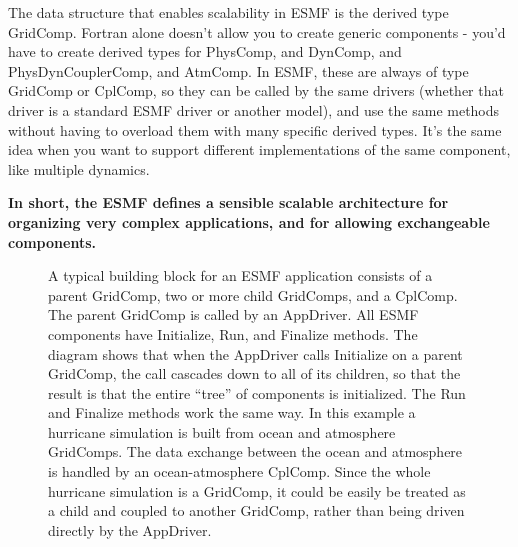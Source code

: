 The data structure that enables scalability in ESMF is the
derived type GridComp.  Fortran alone doesn't allow you to create
generic components - you'd have to create derived types for
PhysComp, and DynComp, and PhysDynCouplerComp, and AtmComp.  In 
ESMF, these are always of type GridComp or CplComp, so they 
can be called by the same drivers (whether that driver is a 
standard ESMF driver or another model), and use the same methods
without having to overload them with many specific derived 
types.  It's the same idea when you want to support different 
implementations of the same component, like multiple dynamics.

{\bf In short, the ESMF defines a sensible scalable 
architecture for organizing very complex applications, and
for allowing exchangeable components.}

\begin{figure}
\caption{A typical building block for an ESMF application consists of a 
parent GridComp, two or more child GridComps, and 
a CplComp.  The parent GridComp is called by an 
AppDriver.  All ESMF components have Initialize, Run, and 
Finalize methods.  The diagram shows that when the AppDriver calls 
Initialize on a parent GridComp, the call cascades down to
all of its children, so that the result is that the entire ``tree''
of components is initialized.  The Run and Finalize methods work the
same way.  In this example a hurricane simulation is built 
from ocean and atmosphere GridComps.  The data exchange between 
the ocean and atmosphere is handled by an ocean-atmosphere CplComp.  
Since the whole hurricane simulation is a GridComp,
it could be easily be treated as a child and coupled to another
GridComp, rather than being driven directly by the AppDriver.}
\label{fig:appunit}
\end{figure}

